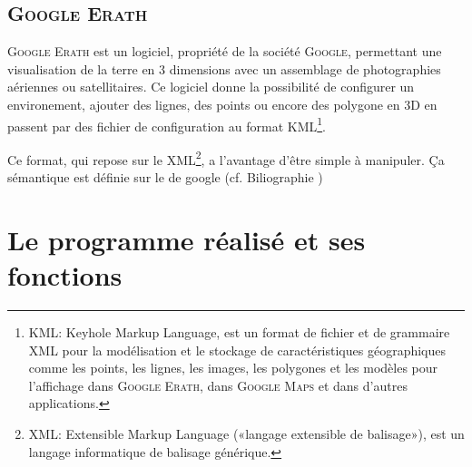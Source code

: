     \subsection{\textsc{Google Erath}}
\textsc{Google Erath} est un logiciel, propriété de la société \textsc{Google}, permettant une visualisation de la terre en 3 dimensions avec un assemblage de photographies aériennes ou satellitaires. Ce logiciel donne la possibilité de configurer un environement, ajouter des lignes, des points ou encore des polygone en 3D en passent par des fichier de configuration au format KML\footnote{\label{Kml}KML: Keyhole Markup Language, est un format de fichier et de grammaire XML pour la modélisation et le stockage de caractéristiques géographiques comme les points, les lignes, les images, les polygones et les modèles pour l'affichage dans \textsc{Google Erath}, dans \textsc{Google Maps} et dans d'autres applications.}.

Ce format, qui repose sur le XML\footnote{XML: Extensible Markup Language («langage extensible de balisage»), est un langage informatique de balisage générique.}, a l'avantage d’être simple à manipuler. Ça sémantique est définie sur le de google (cf. Biliographie \cite{gecode}) 



\section{Le programme réalisé et ses fonctions}
